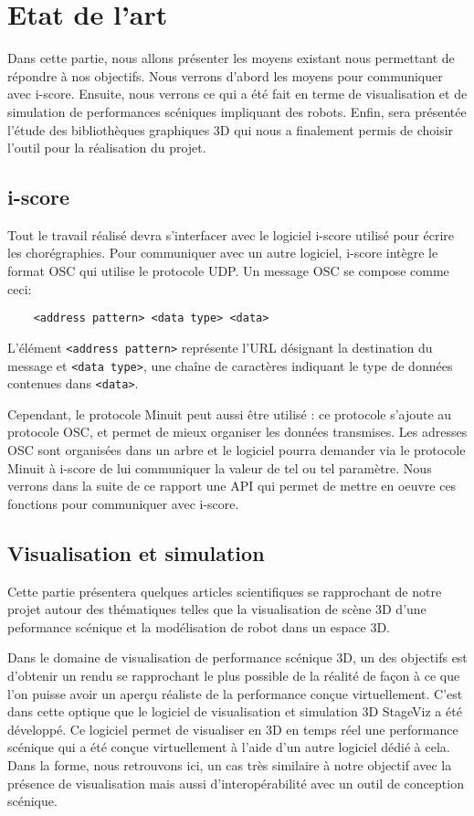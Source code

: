 \section{Etat de l'art}

Dans cette partie, nous allons présenter les moyens existant nous permettant de répondre à nos objectifs. Nous verrons d'abord les moyens pour communiquer avec i-score. Ensuite, nous verrons ce qui a été fait en terme de visualisation et de simulation de performances scéniques impliquant des robots. Enfin, sera présentée l'étude des bibliothèques graphiques 3D qui nous a finalement permis de choisir l'outil pour la réalisation du projet.

\subsection{i-score}

Tout le travail réalisé devra s'interfacer avec le logiciel i-score utilisé pour écrire les chorégraphies. Pour communiquer avec un autre logiciel, i-score intègre le format OSC qui utilise le protocole UDP. Un message OSC se compose comme ceci:
\begin{lstlisting}
	<address pattern> <data type> <data>
\end{lstlisting}

L'élément \verb|<address pattern>| représente l'URL désignant la destination du message et \verb|<data type>|, une chaîne de caractères indiquant le type de données contenues dans \verb|<data>|.

Cependant, le protocole Minuit peut aussi être utilisé : ce protocole s'ajoute au protocole OSC, et permet de mieux organiser les données transmises. Les adresses OSC sont organisées dans un arbre et le logiciel pourra demander via le protocole Minuit à i-score de lui communiquer la valeur de tel ou tel paramètre. Nous verrons dans la suite de ce rapport une API qui permet de mettre en oeuvre ces fonctions pour communiquer avec i-score.

\subsection{Visualisation et simulation}

Cette partie présentera quelques articles scientifiques se rapprochant de notre projet autour des thématiques telles que la visualisation de scène 3D d'une peformance scénique et la modélisation de robot dans un espace 3D. 

Dans le domaine de visualisation de performance scénique 3D, un des objectifs est d'obtenir un rendu se rapprochant le plus possible de la réalité de façon à ce que l'on puisse avoir un aperçu réaliste de la performance conçue virtuellement. C'est dans cette optique que le logiciel de visualisation et simulation 3D StageViz\cite{StageViz} a été développé. Ce logiciel permet de visualiser en 3D en temps réel une performance scénique qui a été conçue virtuellement à l'aide d'un autre logiciel dédié à cela. Dans la forme, nous retrouvons ici, un cas très similaire à notre objectif avec la présence de visualisation mais aussi d'interopérabilité avec un outil de conception scénique.

